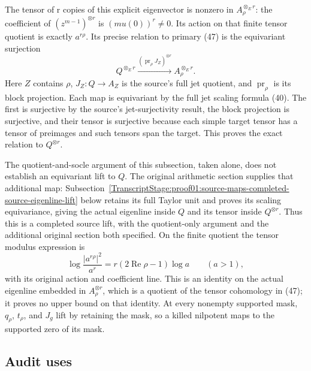 The tensor of r copies of this explicit eigenvector is nonzero in \(A_\rho^{\otimes_E r}\): the coefficient of \((z^{m-1})^{\otimes r}\) is \((m u(0))^r\ne0\). Its action on that finite tensor quotient is exactly \(a^{r\rho}\). Its precise relation to primary (47) is the equivariant surjection \[
Q^{\otimes_E r}\xrightarrow{(\operatorname{pr}_\rho J_Z)^{\otimes r}}
A_\rho^{\otimes_E r}.
\] Here \(Z\) contains \(\rho\), \(J_Z:Q\to A_Z\) is the source's full jet quotient, and \(\operatorname{pr}_\rho\) is its block projection. Each map is equivariant by the full jet scaling formula (40). The first is surjective by the source's jet-surjectivity result, the block projection is surjective, and their tensor is surjective because each simple target tensor has a tensor of preimages and such tensors span the target. This proves the exact relation to \(Q^{\otimes r}\).

The quotient-and-socle argument of this subsection, taken alone, does not establish an equivariant lift to \(Q\). The original arithmetic section supplies that additional map: Subsection~\ref{TranscriptStage:proof01:source-maps-completed-source-eigenline-lift} below retains its full Taylor unit and proves its scaling equivariance, giving the actual eigenline inside \(Q\) and its tensor inside \(Q^{\otimes r}\). Thus this is a completed source lift, with the quotient-only argument and the additional original section both specified. On the finite quotient the tensor modulus expression is \[
\log\frac{|a^{r\rho}|^2}{a^r}=r(2\operatorname{Re}\rho-1)\log a
\qquad(a>1),
\] with its original action and coefficient line. This is an identity on the actual eigenline embedded in \(A_\rho^{\otimes r}\), which is a quotient of the tensor cohomology in (47); it proves no upper bound on that identity. At every nonempty supported mask, \(q_\rho\), \(t_\rho\), and \(J_g\) lift by retaining the mask, so a killed nilpotent maps to the supported zero of its mask.

\subsection{Audit uses}\label{TranscriptStage:proof01:source-maps-audit-uses}

